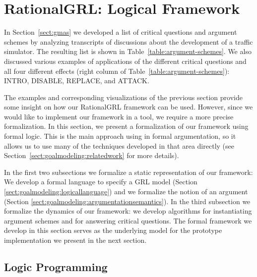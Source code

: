 \section{RationalGRL: Logical Framework}
\label{sect:formalframework}

In Section~\ref{sect:gmas} we developed a list of critical questions and argument schemes by analyzing transcripts of discussions about the development of a traffic simulator. The resulting list is shown in Table~\ref{table:argument-schemes}. We also discussed various examples of applications of the different critical questions and all four different effects (right column of Table~\ref{table:argument-schemes}): \textsf{INTRO}, \textsf{DISABLE}, \textsf{REPLACE}, and \textsf{ATTACK}.

The examples and corresponding visualizations of the previous section provide some insight on how our RationalGRL framework can be used. However, since we would like to implement our framework in a tool, we require a more precise formalization.  In this section, we present a formalization of our framework using formal logic. This is the main approach using in formal argumentation, so it allows us to use many of the techniques developed in that area directly (see Section~\ref{sect:goalmodeling:relatedwork} for more details).

In the first two subsections we formalize a static representation of our framework: We develop a formal language to specify a GRL model (Section \ref{sect:goalmodeling:logicallanguage}) and we formalize the notion of an argument (Section \ref{sect:goalmodeling:argumentationsemantics}). In the third subsection we formalize the dynamics of our framework: we develop algorithms for instantiating argument schemes and for answering critical questions. The formal framework we develop in this section serves as the underlying model for the prototype implementation we present in the next section.

\subsection{Logic Programming}
\label{sect:logicprogramming}

